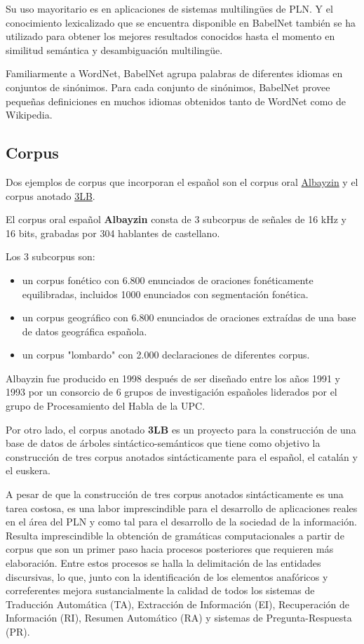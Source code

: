 \documentclass[11pt]{exam}
\begin{document}
\begin{questions}
Su uso mayoritario es en aplicaciones de sistemas multilingües de PLN. Y el conocimiento lexicalizado que se encuentra disponible en BabelNet también se ha utilizado para obtener los mejores resultados conocidos hasta el momento en similitud semántica y desambiguación multilingüe.

Familiarmente a WordNet, BabelNet agrupa palabras de diferentes idiomas en conjuntos de sinónimos. Para cada conjunto de sinónimos, BabelNet provee pequeñas definiciones en muchos idiomas obtenidos tanto de WordNet como de Wikipedia.

\subsection*{Corpus}

Dos ejemplos de corpus que incorporan el español son el corpus oral \href{http://www.talp.upc.edu/content/albayzin}{Albayzin} y el corpus anotado \href{https://www.dlsi.ua.es/projectes/3lb/}{3LB}. 

El corpus oral español {\bf Albayzin} consta de 3 subcorpus de señales de 16 kHz y 16 bits, grabadas por 304 hablantes de castellano.

Los 3 subcorpus son:

\begin{itemize}
	\item un corpus fonético con 6.800 enunciados de oraciones fonéticamente equilibradas, incluidos 1000 enunciados con segmentación fonética.
	\item un corpus geográfico con 6.800 enunciados de oraciones extraídas de una base de datos geográfica española.
	\item un corpus "lombardo" con 2.000 declaraciones de diferentes corpus.
\end{itemize}

Albayzin fue producido en 1998 después de ser diseñado entre los años 1991 y 1993 por un consorcio de 6 grupos de investigación españoles liderados por el grupo de Procesamiento del Habla de la UPC.

Por otro lado, el corpus anotado {\bf 3LB} es un proyecto para la construcción de una base de datos de árboles sintáctico-semánticos que tiene como objetivo la construcción de tres corpus anotados sintácticamente para el español, el catalán y el euskera.

A pesar de que la construcción de tres corpus anotados sintácticamente es una tarea costosa, es una labor imprescindible para el desarrollo de aplicaciones reales en el área del PLN y como tal para el desarrollo de la sociedad de la información. 
Resulta imprescindible la obtención de gramáticas computacionales a partir de corpus que son un primer paso hacia procesos posteriores que requieren más elaboración. Entre estos procesos se halla la delimitación de las entidades discursivas, lo que, junto con la identificación de los elementos anafóricos y correferentes mejora sustancialmente la calidad de todos los sistemas de Traducción Automática (TA), Extracción de Información (EI), Recuperación de Información (RI), Resumen Automático (RA) y sistemas de Pregunta-Respuesta (PR). 


\end{questions}
\end{document}
